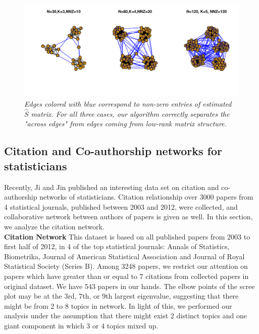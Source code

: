 \documentclass{article}
\begin{document}
\begin{figure}[b]
\begin{center}
\includegraphics[scale=0.75]{Fig2.pdf}
\caption{\it Edges colored with blue correspond to non-zero entries of estimated $\hat{S}$ matrix. For all three cases, our algorithm correctly separates the "across edges" from edges coming from low-rank matrix structure.}
\end{center}
\label{fig:figure2}
\end{figure}

\subsection{Citation and Co-authorship networks for statisticians }
Recently, Ji and Jin \cite{ji2016coauthorship} published an interesting data set on citation  and co-authorship networks of statisticians. Citation relationship over 3000 papers from 4 statistical journals, published between 2003 and 2012, were collected, and collaborative network between authors of papers is given as well. In this section, we analyze the citation network. \\

\noindent\textbf{Citation Network} This dataset is based on all published papers from 2003 to first half of 2012, in 4 of the top statistical journals: Annals of Statistics, Biometrika, Journal of American Statistical Association and Journal of Royal Statistical Society (Series B). Among  3248 papers, we restrict our attention on papers which have greater than or equal to 7 citations from collected papers in original dataset. We have 543 papers in our hands. The elbow points of the scree plot may be at the 3rd, 7th, or 9th largest eigenvalue, suggesting that there might be from 2 to 8 topics in network. In light of this, we performed our analysis under the assumption that there might exist 2 distinct topics and one giant component in which 3 or 4 topics mixed up. \\
\end{document}
